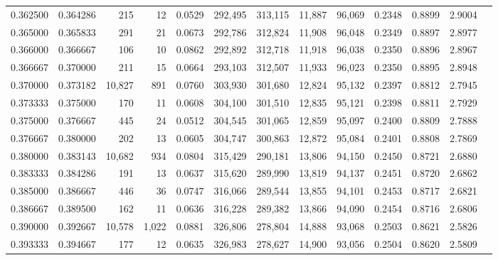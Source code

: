 \begin{tabular}{rrrrrrrrrrrrr}
0.362500 & 0.364286 &    215 &    12 &                                     0.0529 & 292,495 & 313,115 &  11,887 &  96,069 & 0.2348 & 0.8899 & 2.9004 \\
0.365000 & 0.365833 &    291 &    21 &                                     0.0673 & 292,786 & 312,824 &  11,908 &  96,048 & 0.2349 & 0.8897 & 2.8977 \\
0.366000 & 0.366667 &    106 &    10 &                                     0.0862 & 292,892 & 312,718 &  11,918 &  96,038 & 0.2350 & 0.8896 & 2.8967 \\
0.366667 & 0.370000 &    211 &    15 &                                     0.0664 & 293,103 & 312,507 &  11,933 &  96,023 & 0.2350 & 0.8895 & 2.8948 \\
0.370000 & 0.373182 & 10,827 &   891 &                                     0.0760 & 303,930 & 301,680 &  12,824 &  95,132 & 0.2397 & 0.8812 & 2.7945 \\
0.373333 & 0.375000 &    170 &    11 &                                     0.0608 & 304,100 & 301,510 &  12,835 &  95,121 & 0.2398 & 0.8811 & 2.7929 \\
0.375000 & 0.376667 &    445 &    24 &                                     0.0512 & 304,545 & 301,065 &  12,859 &  95,097 & 0.2400 & 0.8809 & 2.7888 \\
0.376667 & 0.380000 &    202 &    13 &                                     0.0605 & 304,747 & 300,863 &  12,872 &  95,084 & 0.2401 & 0.8808 & 2.7869 \\
0.380000 & 0.383143 & 10,682 &   934 &                                     0.0804 & 315,429 & 290,181 &  13,806 &  94,150 & 0.2450 & 0.8721 & 2.6880 \\
0.383333 & 0.384286 &    191 &    13 &                                     0.0637 & 315,620 & 289,990 &  13,819 &  94,137 & 0.2451 & 0.8720 & 2.6862 \\
0.385000 & 0.386667 &    446 &    36 &                                     0.0747 & 316,066 & 289,544 &  13,855 &  94,101 & 0.2453 & 0.8717 & 2.6821 \\
0.386667 & 0.389500 &    162 &    11 &                                     0.0636 & 316,228 & 289,382 &  13,866 &  94,090 & 0.2454 & 0.8716 & 2.6806 \\
0.390000 & 0.392667 & 10,578 & 1,022 &                                     0.0881 & 326,806 & 278,804 &  14,888 &  93,068 & 0.2503 & 0.8621 & 2.5826 \\
0.393333 & 0.394667 &    177 &    12 &                                     0.0635 & 326,983 & 278,627 &  14,900 &  93,056 & 0.2504 & 0.8620 & 2.5809 \\

\end{tabular}
